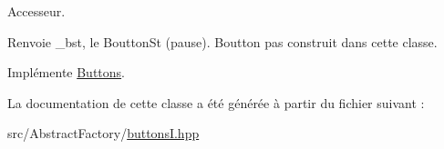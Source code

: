 Accesseur. 

\begin{DoxyReturn}{Renvoie}
\+\_\+bst, le Boutton\+St (pause). Boutton pas construit dans cette classe. 
\end{DoxyReturn}


Implémente \hyperlink{classButtons_a2e03184bee5b70e8acb1f53c98632350}{Buttons}.



La documentation de cette classe a été générée à partir du fichier suivant \+:\begin{DoxyCompactItemize}
\item 
src/\+Abstract\+Factory/\hyperlink{buttonsI_8hpp}{buttons\+I.\+hpp}\end{DoxyCompactItemize}
